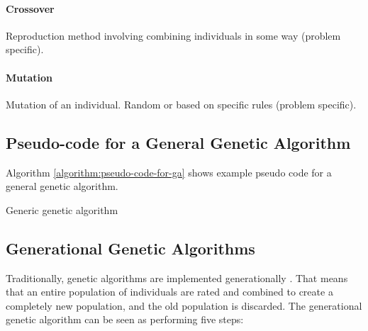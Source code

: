 \paragraph{Crossover}
Reproduction method involving combining individuals in some way (problem specific). 

\paragraph{Mutation}
Mutation of an individual. Random or based on specific rules (problem specific). 

\subsection{Pseudo-code for a General Genetic Algorithm}

Algorithm \vref{algorithm:pseudo-code-for-ga} shows example pseudo code for a general genetic algorithm.

\begin{algorithm}[H]
\SetAlgoLined
\DontPrintSemicolon
{}
\caption{Generic genetic algorithm}
\label{algorithm:pseudo-code-for-ga}
\end{algorithm}


\subsection{Generational Genetic Algorithms}

Traditionally, genetic algorithms are implemented generationally . That means that an entire population of individuals are rated and combined to create a completely new population, and the old population is discarded. The generational genetic algorithm can be seen as performing five steps:


